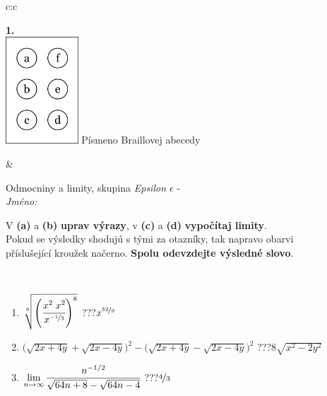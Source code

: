 \documentclass[10pt]{report}
\begin{document}
\begin{tabular}{c:c}
\begin{minipage}[c][104.5mm][t]{0.5\linewidth}
\begin{center}
\begin{minipage}{0.20\linewidth}
\begin{center}
{\Huge\bfseries 1.} \\[2mm]
\includegraphics[height=40mm]{../images/braille.png}
{\small Písmeno Braillovej abecedy}
\end{center}
\end{minipage}
\end{center}
\end{minipage}
&
\begin{minipage}[c][104.5mm][t]{0.5\linewidth}
\begin{center}
\vspace{7mm}
{\huge Odmocniny a limity, skupina \textit{Epsilon $\epsilon$} -}\\[5mm]
\textit{Jméno:}\phantom{xxxxxxxxxxxxxxxxxxxxxxxxxxxxxxxxxxxxxxxxxxxxxxxxxxxxxxxxxxxxxxxxx}\\[5mm]
\begin{minipage}{0.95\linewidth}
\begin{center}
V \textbf{(a)} a \textbf{(b)} \textbf{uprav výrazy}, v \textbf{(c)} a \textbf{(d)} \textbf{vypočítaj limity}.\\Pokud se výsledky shodujú s tými za otazníky, tak napravo obarvi\\příslušející kroužek načerno. \textbf{Spolu odevzdejte výsledné slovo}.
\end{center}
\end{minipage}
\\[1mm]
\begin{minipage}{0.79\linewidth}
\begin{center}
\begin{varwidth}{\linewidth}
\begin{enumerate}
\small
\item $\sqrt[6]{\left(\cfrac{x^{2}\;x^{2}}{x^{\nicefrac{-1}{3}}}\right)^{8}}$\quad \dotfill\; ???\;\dotfill \quad $x^{\nicefrac{52}{9}}$
\item {\footnotesize{\scriptsize$\big(\sqrt{2x+4y}+\sqrt{2x-4y}\big)^2-\big(\sqrt{2x+4y}-\sqrt{2x-4y}\big)^2$}\quad \dotfill\; ???\;\dotfill \quad $8\sqrt{x^2-2y^2}$}
\item $\lim\limits_{n\to\infty}\cfrac{n^{-1/2}}{\sqrt{64n+8}-\sqrt{64n-4}}$\quad \dotfill\; ???\;\dotfill \quad $\nicefrac{4}{3}$

\end{enumerate}
\end{varwidth}
\end{center}
\end{minipage}
\end{center}
\end{minipage}
\end{tabular}
\end{document}
